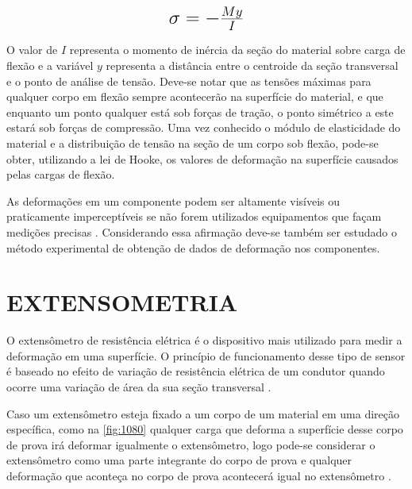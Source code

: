 \begin{equation}\label{eq:Eq_200}%
\mbox{\fontsize{17.28}{21.6}\selectfont\( %
\sigma = - \frac{My}{I}
\)} %
\end{equation}

%
%
%
%

\hfill

O valor de $I$ representa o momento de inércia da seção do material sobre carga de flexão e a variável $y$ representa a distância entre o centroide da seção transversal
e o ponto de análise de tensão. Deve-se notar que as tensões máximas para qualquer corpo em flexão sempre acontecerão na superfície do material, e que enquanto um ponto
qualquer está sob forças de tração, o ponto simétrico a este estará sob forças de compressão.
Uma vez conhecido o módulo de elasticidade do material e a distribuição de tensão na seção de um corpo sob flexão, pode-se obter, utilizando a lei de Hooke, os valores
de deformação na superfície causados pelas cargas de flexão.

As deformações em um componente podem ser altamente visíveis ou praticamente imperceptíveis se não forem utilizados equipamentos que façam medições precisas
\autocite{Hibbeler2010}. Considerando essa afirmação deve-se também ser estudado o método experimental de obtenção de dados de deformação nos componentes.

\section{EXTENSOMETRIA}

O extensômetro de resistência elétrica é o dispositivo mais utilizado para medir a deformação em uma superfície.
O princípio de funcionamento desse tipo de sensor é baseado no efeito de variação de resistência elétrica de um condutor quando
ocorre uma variação de área da sua seção transversal \autocite{Hollman2011}.

Caso um extensômetro esteja fixado a um corpo de um material em uma direção específica, como na \autoref{fig:1080} qualquer carga que deforma a superfície desse corpo de prova irá
deformar igualmente o extensômetro, logo pode-se considerar o extensômetro como uma parte integrante do corpo de prova e qualquer deformação que aconteça no corpo de
prova acontecerá igual no extensômetro \autocite{Hibbeler2010}.

